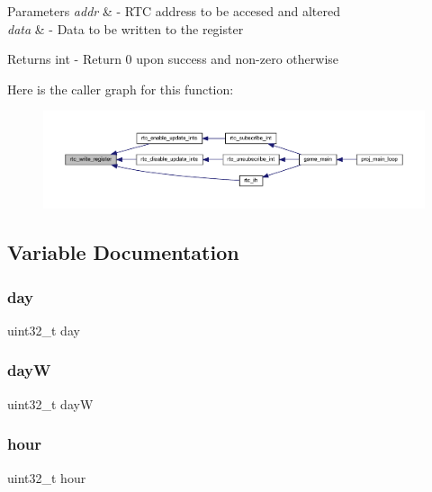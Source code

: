 \begin{DoxyParams}{Parameters}
{\em addr} & -\/ R\+TC address to be accesed and altered \\
\hline
{\em data} & -\/ Data to be written to the register \\
\hline
\end{DoxyParams}
\begin{DoxyReturn}{Returns}
int -\/ Return 0 upon success and non-\/zero otherwise 
\end{DoxyReturn}
Here is the caller graph for this function\+:
\nopagebreak
\begin{figure}[H]
\begin{center}
\leavevmode
\includegraphics[width=350pt]{group__rtc_ga9b5d85527d676067a8c05780ec46d4f1_icgraph}
\end{center}
\end{figure}


\subsection{Variable Documentation}
\mbox{\label{group__rtc_ga897ed87b95b7a37afeeb935ca0b2366b}} 
\subsubsection{\texorpdfstring{day}{day}}
{\footnotesize\ttfamily uint32\+\_\+t day}

\mbox{\label{group__rtc_gaa24f12f79f7553236083be08521c546e}} 
\subsubsection{\texorpdfstring{dayW}{dayW}}
{\footnotesize\ttfamily uint32\+\_\+t dayW}

\mbox{\label{group__rtc_ga26d5bae76d83086900174b266fd2cd82}} 
\subsubsection{\texorpdfstring{hour}{hour}}
{\footnotesize\ttfamily uint32\+\_\+t hour}

